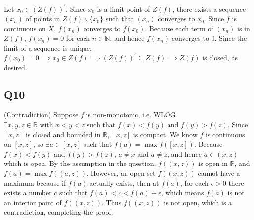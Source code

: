 \documentclass[12pt,lettersize]{article}
\newcommand{\R}{\mathbb{R}}
\newcommand{\N}{\mathbb{N}}
\begin{document}
	Let $x_0\in(Z(f))^\prime$. Since $x_0$ is a limit point of $Z(f)$, there exists a sequence $(x_n)$ of points in $Z(f)\backslash\{x_0\}$ such that $(x_n)$ converges to $x_0$. Since $f$ is continuous on $X$, $f(x_n)$ converges to $f(x_0)$. Because each term of $(x_n)$ is in $Z(f)$, $f(x_n)=0$ for each $n\in\N$, and hence $f(x_n)$ converges to $0$. Since the limit of a sequence is unique, $f(x_0)=0\implies x_0\in Z(f)\implies (Z(f))^\prime\subseteq Z(f)\implies Z(f)$ is closed, as desired.    
	\newpage
	
	\subsection*{Q10}
	(Contradiction) Suppose $f$ is non-monotonic, i.e. WLOG $\exists x,y,z\in\R\text{ with } x<y<z\text{ such that } f(x)<f(y)\text{ and }f(y)>f(z)$. Since $[x,z]$ is closed and bounded in $\R$, $[x,z]$ is compact. We know $f$ is continuous on $[x,z]$, so $\exists a\in[x,z]$ such that $f(a)=\max f([x,z])$. Because $f(x)<f(y)$ and $f(y)>f(z)$, $a\neq x$ and $a\neq z$, and hence $a\in(x,z)$ which is open. By the assumption in the question, $f((x,z))$ is open in $\R$, and $f(a)=\max f((a,z))$. However, an open set $f((x,z))$ cannot have a maximum because if $f(a)$ actually exists, then at $f(a)$, for each $\epsilon>0$ there exists a number $c$ such that $f(a)<c<f(a)+\epsilon$, which means $f(a)$ is not an interior point of $f((x,z))$. Thus $f((x,z))$ is not open, which is a contradiction, completing the proof. 
	\newpage
	
\end{document}
